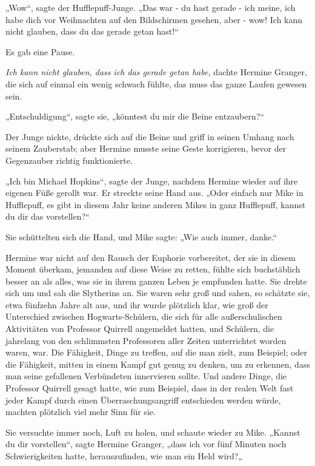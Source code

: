 {„Wow“, sagte der Hufflepuff-Junge. „Das war - du hast gerade - ich meine, ich habe dich vor Weihnachten auf den Bildschirmen gesehen, aber - wow! Ich kann nicht glauben, dass du das gerade getan hast!“

Es gab eine Pause.

\emph{Ich kann nicht glauben, dass ich das gerade getan habe,} dachte Hermine Granger, die sich auf einmal ein wenig schwach fühlte, das muss das ganze Laufen gewesen sein.

„Entschuldigung“, sagte sie, „könntest du mir die Beine entzaubern?“

Der Junge nickte, drückte sich auf die Beine und griff in seinen Umhang nach seinem Zauberstab; aber Hermine musste seine Geste korrigieren, bevor der Gegenzauber richtig funktionierte.

„Ich bin Michael Hopkins“, sagte der Junge, nachdem Hermine wieder auf ihre eigenen Füße gerollt war. Er streckte seine Hand aus. „Oder einfach nur Mike in Hufflepuff, es gibt in diesem Jahr keine anderen Mikes in ganz Hufflepuff, kannst du dir das vorstellen?“

Sie schüttelten sich die Hand, und Mike sagte: „Wie auch immer, danke.“

Hermine war nicht auf den Rausch der Euphorie vorbereitet, der sie in diesem Moment überkam, jemanden auf diese Weise zu retten, fühlte sich buchstäblich besser an als alles, was sie in ihrem ganzen Leben je empfunden hatte. Sie drehte sich um und sah die Slytherins an. Sie waren sehr groß und sahen, so schätzte sie, etwa fünfzehn Jahre alt aus, und ihr wurde plötzlich klar, wie groß der Unterschied zwischen Hogwarts-Schülern, die sich für alle außerschulischen Aktivitäten von Professor Quirrell angemeldet hatten, und Schülern, die jahrelang von den schlimmsten Professoren aller Zeiten unterrichtet worden waren, war. Die Fähigkeit, Dinge zu treffen, auf die man zielt, zum Beispiel; oder die Fähigkeit, mitten in einem Kampf gut genug zu denken, um zu erkennen, dass man seine gefallenen Verbündeten innervieren sollte. Und andere Dinge, die Professor Quirrell gesagt hatte, wie zum Beispiel, dass in der realen Welt fast jeder Kampf durch einen Überraschungsangriff entschieden werden würde, machten plötzlich viel mehr Sinn für sie.

Sie versuchte immer noch, Luft zu holen, und schaute wieder zu Mike. „Kannst du dir vorstellen“, sagte Hermine Granger, „dass ich vor fünf Minuten noch Schwierigkeiten hatte, herauszufinden, wie man ein Held wird?„

}
